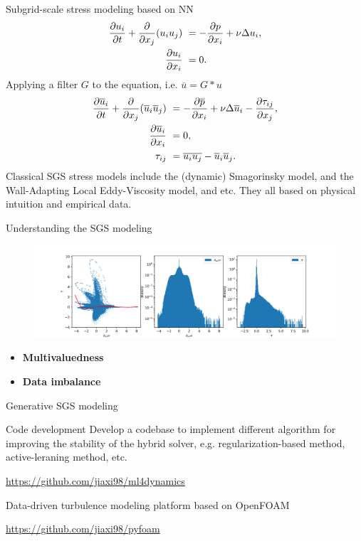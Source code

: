 \documentclass[aspectratio=169]{beamer}
\begin{document}
\begin{frame}{Subgrid-scale stress modeling based on NN}
	\begin{equation*}
		\begin{aligned}
		\frac{\partial u_i}{\partial t} + \frac{\partial}{\partial x_j}(u_iu_j) & \ = 
		-\frac{\partial p}{\partial x_i} + \nu\Delta u_i,   \\
		\frac{\partial u_i}{\partial x_i} & \ = 0.
		\end{aligned}
	\end{equation*}
	Applying a filter $G$ to the equation, i.e. 
	$\overline{u} = G * u$
	\begin{equation*}
		\begin{aligned}
		\frac{\partial \overline{u}_i}{\partial t} + \frac{\partial}{\partial x_j}(\overline{u}_i
		\overline{u}_j) & \ = -\frac{\partial \overline{p}}{\partial x_i} + \nu\Delta 
		\overline{u}_i - \frac{\partial \tau_{ij}}{\partial x_j},   \\
		\frac{\partial \overline{u}_i}{\partial x_i} & \ = 0,		\\
		\tau_{ij} & \ = \overline{u_iu_j} - \overline{u}_i\overline{u}_j.
		\end{aligned}
	\end{equation*}
	Classical SGS stress models include the (dynamic) Smagorinsky model, 
	and the Wall-Adapting Local Eddy-Viscosity model, and etc. They all based
	on physical intuition and empirical data.
\end{frame}

\begin{frame}{Understanding the SGS modeling}
	\begin{figure}[ht]
     \centering 
     \includegraphics[width=\textwidth]
     {fig/ks_hist.png} 
\end{figure}

\begin{itemize}
	\item \textbf{Multivaluedness}
	\item \textbf{Data imbalance}
\end{itemize}
\end{frame}

\begin{frame}{Generative SGS modeling}
	
\end{frame}



\begin{frame}{Code development}
	Develop a codebase to implement different algorithm for improving the stability
	of the hybrid solver, e.g. regularization-based method, active-leraning method, etc.

	\url{https://github.com/jiaxi98/ml4dynamics}

	Data-driven turbulence modeling platform based on OpenFOAM
	
	\url{https://github.com/jiaxi98/pyfoam}
\end{frame}
\end{document}
